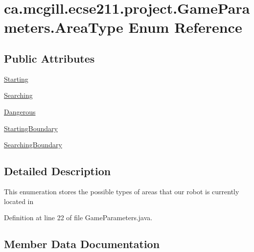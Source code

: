\hypertarget{enumca_1_1mcgill_1_1ecse211_1_1project_1_1_game_parameters_1_1_area_type}{}\section{ca.\+mcgill.\+ecse211.\+project.\+Game\+Parameters.\+Area\+Type Enum Reference}
\label{enumca_1_1mcgill_1_1ecse211_1_1project_1_1_game_parameters_1_1_area_type}
\subsection*{Public Attributes}
\begin{DoxyCompactItemize}
\item 
\hyperlink{enumca_1_1mcgill_1_1ecse211_1_1project_1_1_game_parameters_1_1_area_type_a3e0e6dda84dcf0572039c349889217c5}{Starting}
\item 
\hyperlink{enumca_1_1mcgill_1_1ecse211_1_1project_1_1_game_parameters_1_1_area_type_a25564076fdd8880377fbd6eaf753456f}{Searching}
\item 
\hyperlink{enumca_1_1mcgill_1_1ecse211_1_1project_1_1_game_parameters_1_1_area_type_ac762256f8b33e7c93c162520a0349769}{Dangerous}
\item 
\hyperlink{enumca_1_1mcgill_1_1ecse211_1_1project_1_1_game_parameters_1_1_area_type_afd78c1184c6b82e22bb08ed39ae4e83b}{Starting\+Boundary}
\item 
\hyperlink{enumca_1_1mcgill_1_1ecse211_1_1project_1_1_game_parameters_1_1_area_type_a5a3aceb665ba97ac242e77955feed640}{Searching\+Boundary}
\end{DoxyCompactItemize}


\subsection{Detailed Description}
This enumeration stores the possible types of areas that our robot is currently located in 

Definition at line 22 of file Game\+Parameters.\+java.



\subsection{Member Data Documentation}
\mbox{\label{enumca_1_1mcgill_1_1ecse211_1_1project_1_1_game_parameters_1_1_area_type_ac762256f8b33e7c93c162520a0349769}} 
